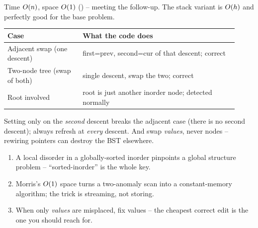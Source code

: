 
\begin{complexitybox}
Time $O(n)$, space $O(1)$ () -- meeting the follow-up.
The stack variant is $O(h)$ and perfectly good for the base problem.
\end{complexitybox}

\begin{center}\renewcommand{\arraystretch}{1.2}
\begin{tabular}{@{}p{0.30\linewidth} p{0.62\linewidth}@{}}
\toprule
\textbf{Case} & \textbf{What the code does} \\
\midrule
Adjacent swap (one descent) & first=prev, second=cur of that descent; correct \\
Two-node tree (swap of both) & single descent, swap the two; correct \\
Root involved & root is just another inorder node; detected normally \\
\bottomrule
\end{tabular}\end{center}

\begin{warningbox}
Setting  only on the \emph{second} descent breaks the adjacent case (there is
no second descent); always refresh  at \emph{every} descent. And swap
\emph{values}, never nodes -- rewiring pointers can destroy the BST elsewhere.
\end{warningbox}

\begin{insightbox}
\begin{enumerate}[nosep, leftmargin=1.6em]
  \item A local disorder in a globally-sorted inorder pinpoints a global structure
        problem -- ``sorted-inorder'' is the whole key.
  \item Morris's $O(1)$ space turns a two-anomaly scan into a constant-memory
        algorithm; the trick is streaming, not storing.
  \item When only \emph{values} are misplaced, fix values -- the cheapest correct edit is
        the one you should reach for.
\end{enumerate}
\end{insightbox}

